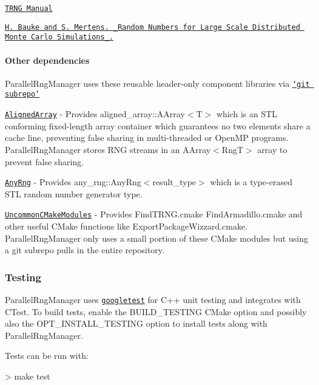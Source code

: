 \begin{DoxyItemize}
\item \href{https://www.numbercrunch.de/trng/trng.pdf}{\tt T\-R\-N\-G Manual}
\item \href{http://arxiv.org/abs/cond-mat/0609584}{\tt H. Bauke and S. Mertens. \-\_\-\-Random Numbers for Large Scale Distributed Monte Carlo Simulations\-\_\-.}
\end{DoxyItemize}

\paragraph*{Other dependencies}

Parallel\-Rng\-Manager uses these reusable header-\/only component libraries via \href{https://github.com/ingydotnet/git-subrepo}{\tt `git subrepo`}
\begin{DoxyItemize}
\item \href{https://github.com/markjolah/AlignedArray}{\tt Aligned\-Array} -\/ Provides {\ttfamily aligned\-\_\-array\-::\-A\-Array$<$T$>$} which is an S\-T\-L conforming fixed-\/length array container which guarantees no two elements share a cache line, preventing false sharing in multi-\/threaded or Open\-M\-P programs. Parallel\-Rng\-Manager stores R\-N\-G streams in an {\ttfamily A\-Array$<$Rng\-T$>$} array to prevent false sharing.
\item \href{https://github.com/markjolah/AnyRng}{\tt Any\-Rng} -\/ Provides {\ttfamily any\-\_\-rng\-::\-Any\-Rng$<$result\-\_\-type$>$} which is a type-\/erased S\-T\-L random number generator type.
\item \href{https://github.com/markjolah/UncommonCMakeModules}{\tt Uncommon\-C\-Make\-Modules} -\/ Provides {\ttfamily Find\-T\-R\-N\-G.\-cmake} {\ttfamily Find\-Armadillo.\-cmake} and other useful C\-Make functions like {\ttfamily Export\-Package\-Wizzard.\-cmake}. Parallel\-Rng\-Manager only uses a small portion of these C\-Make modules but using a {\ttfamily git subrepo} pulls in the entire repository.
\end{DoxyItemize}

\subsubsection*{Testing}

Parallel\-Rng\-Manager uses \href{https://github.com/google/googletest}{\tt googletest} for C++ unit testing and integrates with C\-Test. To build tests, enable the {\ttfamily B\-U\-I\-L\-D\-\_\-\-T\-E\-S\-T\-I\-N\-G} C\-Make option and possibly also the {\ttfamily O\-P\-T\-\_\-\-I\-N\-S\-T\-A\-L\-L\-\_\-\-T\-E\-S\-T\-I\-N\-G} option to install tests along with Parallel\-Rng\-Manager.

Tests can be run with\-: \begin{DoxyVerb}> make test\end{DoxyVerb}
 